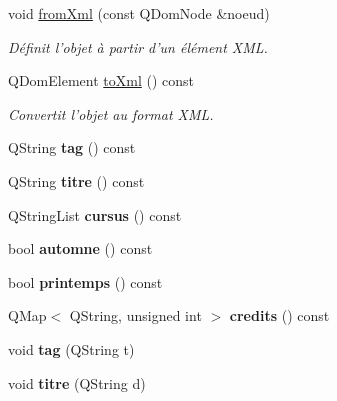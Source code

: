 \begin{DoxyCompactItemize}
\item 
\hypertarget{classUV_a189e0eb0552c048eec21c2f37e49dc4b}{void \hyperlink{classUV_a189e0eb0552c048eec21c2f37e49dc4b}{from\+Xml} (const Q\+Dom\+Node \&noeud)}\label{classUV_a189e0eb0552c048eec21c2f37e49dc4b}

\begin{DoxyCompactList}\small\item\em Définit l'objet à partir d'un élément X\+M\+L. \end{DoxyCompactList}\item 
Q\+Dom\+Element \hyperlink{classUV_a2b60d0325f1117f3228f8ff32667e860}{to\+Xml} () const 
\begin{DoxyCompactList}\small\item\em Convertit l'objet au format X\+M\+L. \end{DoxyCompactList}\item 
\hypertarget{classUV_a32444f5089aad36c217b2c4de6a7ee65}{Q\+String {\bfseries tag} () const }\label{classUV_a32444f5089aad36c217b2c4de6a7ee65}

\item 
\hypertarget{classUV_ae88e929ca287f9b997ccffeaefba1344}{Q\+String {\bfseries titre} () const }\label{classUV_ae88e929ca287f9b997ccffeaefba1344}

\item 
\hypertarget{classUV_a8a384525c3ab6c316393cbee86bcdf6f}{Q\+String\+List {\bfseries cursus} () const }\label{classUV_a8a384525c3ab6c316393cbee86bcdf6f}

\item 
\hypertarget{classUV_a4b8c342724e30ea587ba15b914b741e5}{bool {\bfseries automne} () const }\label{classUV_a4b8c342724e30ea587ba15b914b741e5}

\item 
\hypertarget{classUV_ad81328803813c7197f959a42984485bc}{bool {\bfseries printemps} () const }\label{classUV_ad81328803813c7197f959a42984485bc}

\item 
\hypertarget{classUV_acff84ec643c8bdf7e30c0837f61ada14}{Q\+Map$<$ Q\+String, unsigned int $>$ {\bfseries credits} () const }\label{classUV_acff84ec643c8bdf7e30c0837f61ada14}

\item 
\hypertarget{classUV_ab450823845332c36d69c1896dc4f9f58}{void {\bfseries tag} (Q\+String t)}\label{classUV_ab450823845332c36d69c1896dc4f9f58}

\item 
\hypertarget{classUV_a27b848bf182243f1620ccaa4e919ea95}{void {\bfseries titre} (Q\+String d)}\label{classUV_a27b848bf182243f1620ccaa4e919ea95}


\end{DoxyCompactItemize}
